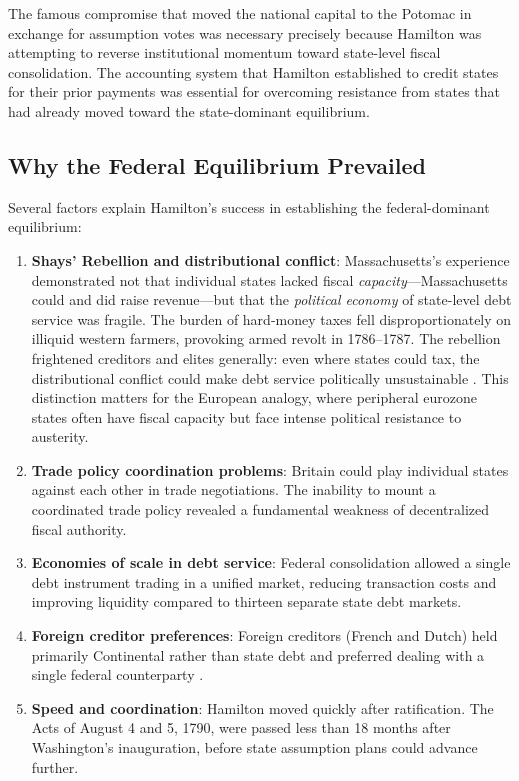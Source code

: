 \documentclass[12pt]{article}
\begin{document}
The famous compromise that moved the national capital to the Potomac in
exchange for assumption votes was necessary precisely because Hamilton
was attempting to reverse institutional momentum toward state-level
fiscal consolidation. The accounting system that Hamilton established to
credit states for their prior payments \citep[pp.~293--297]{Ferguson1961}
was essential for overcoming resistance from states that had already
moved toward the state-dominant equilibrium.

\subsection{Why the Federal Equilibrium Prevailed}
\label{sec:shays}

Several factors explain Hamilton's success in establishing the
federal-dominant equilibrium:

\begin{enumerate}
\item \textbf{Shays' Rebellion and distributional conflict}:
  Massachusetts's experience demonstrated not that individual states
  lacked fiscal \emph{capacity}---Massachusetts could and did raise
  revenue---but that the \emph{political economy} of state-level debt
  service was fragile. The burden of hard-money taxes fell
  disproportionately on illiquid western farmers, provoking armed revolt
  in 1786--1787. The rebellion frightened creditors and elites generally:
  even where states could tax, the distributional conflict could make
  debt service politically unsustainable
  \citep[pp.~243--245]{Ferguson1961}. This distinction matters for the
  European analogy, where peripheral eurozone states often have fiscal
  capacity but face intense political resistance to austerity.

\item \textbf{Trade policy coordination problems}: Britain could play
  individual states against each other in trade negotiations. The
  inability to mount a coordinated trade policy revealed a fundamental
  weakness of decentralized fiscal authority.

\item \textbf{Economies of scale in debt service}: Federal consolidation
  allowed a single debt instrument trading in a unified market, reducing
  transaction costs and improving liquidity compared to thirteen separate
  state debt markets.

\item \textbf{Foreign creditor preferences}: Foreign creditors (French
  and Dutch) held primarily Continental rather than state debt and
  preferred dealing with a single federal counterparty
  \citep[pp.~251--253]{Ferguson1961}.

\item \textbf{Speed and coordination}: Hamilton moved quickly after
  ratification. The Acts of August 4 and 5, 1790, were passed less than
  18 months after Washington's inauguration, before state assumption
  plans could advance further.
\end{enumerate}
\end{document}
